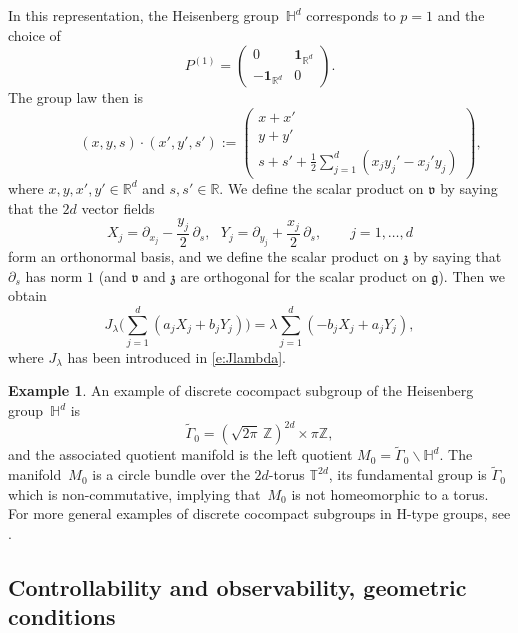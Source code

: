 \documentclass[JEP,XML,SOM,Unicode,published]{cedram}
\newcommand{\bun}{\mathbf{1}}
\theoremstyle{plain}
\theoremstyle{definition}
\newtheorem{example}[theorem]{Example}
\def\R{{\mathbb R}}
\def\Z{{\mathbb Z}}
\def\T{{\mathbb T}}
\def\bbH{{\mathbb H}}
\begin{document}
In this representation, the Heisenberg group~$\bbH^d$ corresponds to $p=1$ and the choice of
\[
{P^{(1)}= \begin{pmatrix} 0 & \bun_{\R^d} \\ - \bun_{\R^d} & 0\end{pmatrix}}.
\]
The group law then is
\begin{equation*}
\quad \quad \quad (x,y,s) \cdot (x',y',s'):=\begin{pmatrix}
x+x'\\ y+y'\\s+s'+\frac12 \sum_{j=1}^d(x_jy_j'-x_j'y_j)
\end{pmatrix},
\end{equation*}
where $x,y,x',y'\in\R^d$ and $s,s'\in\R$. We define the scalar product on $\mathfrak v$ by saying that the $2d$ vector fields
\begin{equation}\label{def:XY}
X_j=\partial_{x_j}-\frac{y_j}{2}\,\partial_{s}, \ \ \ Y_j=\partial_{y_j}+\frac{x_j}{2}\,\partial_{s}, \qquad j=1,\ldots,d
\end{equation}
form an orthonormal basis, and we define the scalar product on $\mathfrak z$ by saying that $\partial_s$ has norm $1$ (and $\mathfrak v$ and $\mathfrak z$ are orthogonal for the scalar product on $\mathfrak g$). Then we obtain
\begin{equation*}
J_\lambda\biggl(\sum_{j=1}^d (a_jX_j+b_jY_j)\biggr)=\lambda\sum_{j=1}^d (-b_jX_j+a_jY_j),
\end{equation*}
where $J_\lambda$ has been introduced in \eqref{e:Jlambda}.

\begin{example}\label{ex:general1}
An example of discrete cocompact subgroup of the Heisenberg group~$\bbH^d$ is
\begin{equation*}%
\widetilde{\Gamma}_0=(\sqrt{2\pi}\,\Z)^{2d}\times \pi\Z,
\end{equation*}
and the associated quotient manifold is the left quotient $M_0=\widetilde{\Gamma}_0\backslash \bbH^d$. The manifold~$M_0$ is a circle bundle over the $2d$-torus $\T^{2d}$, its fundamental group is $\widetilde{\Gamma}_0$ which is non-commutative, implying that~$M_0$ is not homeomorphic to a torus.
For more general examples of discrete cocompact subgroups in H-type groups, see \cite[Chap.\,5]{CG}.
\end{example}

\subsection{Controllability and observability, geometric conditions}
\end{document}
